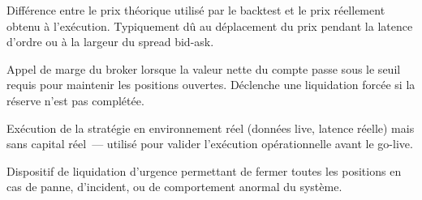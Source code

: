 \begin{description}[style=nextline, leftmargin=0.5cm, itemsep=0.4em]
\item[\textbf{Slippage}] Différence entre le prix théorique utilisé par le backtest et le prix réellement obtenu à l'exécution. Typiquement dû au déplacement du prix pendant la latence d'ordre ou à la largeur du spread bid-ask.

\item[\textbf{Margin call}] Appel de marge du broker lorsque la valeur nette du compte passe sous le seuil requis pour maintenir les positions ouvertes. Déclenche une liquidation forcée si la réserve n'est pas complétée.

\item[\textbf{Paper-trade}] Exécution de la stratégie en environnement réel (données live, latence réelle) mais sans capital réel~--- utilisé pour valider l'exécution opérationnelle avant le go-live.

\item[\textbf{Kill switch}] Dispositif de liquidation d'urgence permettant de fermer toutes les positions en cas de panne, d'incident, ou de comportement anormal du système.
\end{description}

